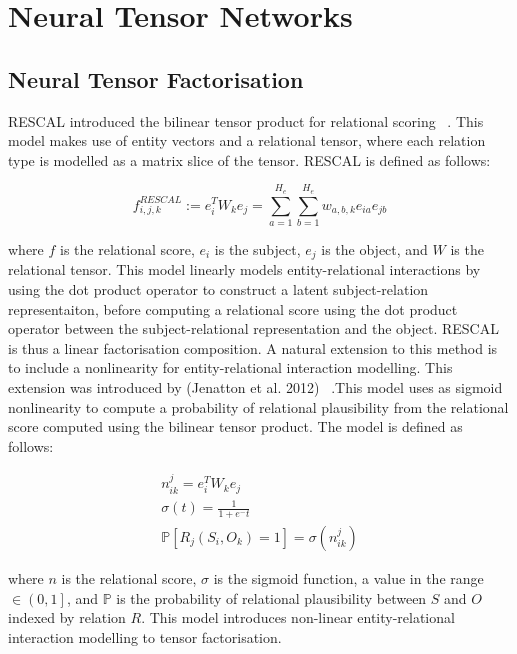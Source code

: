 
\section{Neural Tensor Networks}

\subsection{Neural Tensor Factorisation}
RESCAL introduced the bilinear tensor product for relational scoring ~\citep{nickel2011three}. This model makes use of entity vectors and a relational tensor, where each relation type is modelled as a matrix slice of the tensor. RESCAL is defined as follows:

\begin{equation}
	f_{i, j, k}^{RESCAL} := e_i^TW_ke_j = \sum_{a=1}^{H_e}\sum_{b=1}^{H_e}w_{a,b,k}e_{ia}e_{jb}
\end{equation}

where $f$ is the relational score, $e_i$ is the subject, $e_j$ is the object, and $W$ is the relational tensor. This model linearly models entity-relational interactions by using the dot product operator to construct a latent subject-relation representaiton, before computing a relational score using the dot product operator between the subject-relational representation and the object. RESCAL is thus a linear factorisation composition. \newline
A natural extension to this method is to include a nonlinearity for entity-relational interaction modelling. This extension was introduced by (Jenatton et al. 2012) ~\citep{jenatton2012latent}.This model uses as sigmoid nonlinearity to compute a probability of relational plausibility from the relational score computed using the bilinear tensor product. The model is defined as follows:

\begin{subequations}
	\begin{gather}
		n_{ik}^{j} = e_i^TW_ke_j \\
		\sigma(t) = \frac{1}{1 + e^-t} \\
		\mathbb{P}\left [ R_j(S_i, O_k) = 1 \right ] = \sigma(n_{ik}^{j})
	\end{gather}
\end{subequations}

where $n$ is the relational score, $\sigma$ is the sigmoid function, a value in the range $\in \left ( 0, 1 \right ]$, and $\mathbb{P}$ is the probability of relational plausibility between $S$ and $O$ indexed by relation $R$. This model introduces non-linear entity-relational interaction modelling to tensor factorisation. 

